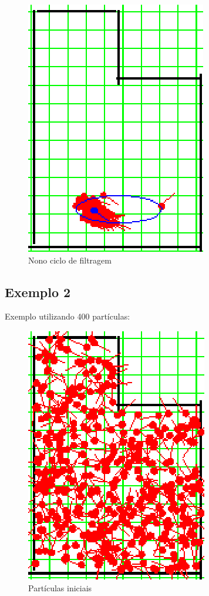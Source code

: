 \begin{figure}[H]
  \centering
  \includegraphics[scale=0.6]{figuras/cen1_ex1/10.eps}
  \caption[Nono Ciclo de Filtragem]{Nono ciclo de filtragem}
  \label{img:cen1_ex1_10}
\end{figure}

\subsection{Exemplo 2}

Exemplo utilizando 400 partículas:

\begin{figure}[H]
  \centering
  \includegraphics[scale=0.6]{figuras/cen1_ex2/1.eps}
  \caption[Partículas Iniciais]{Partículas iniciais}
  \label{img:cen1_ex2_1}
\end{figure}

